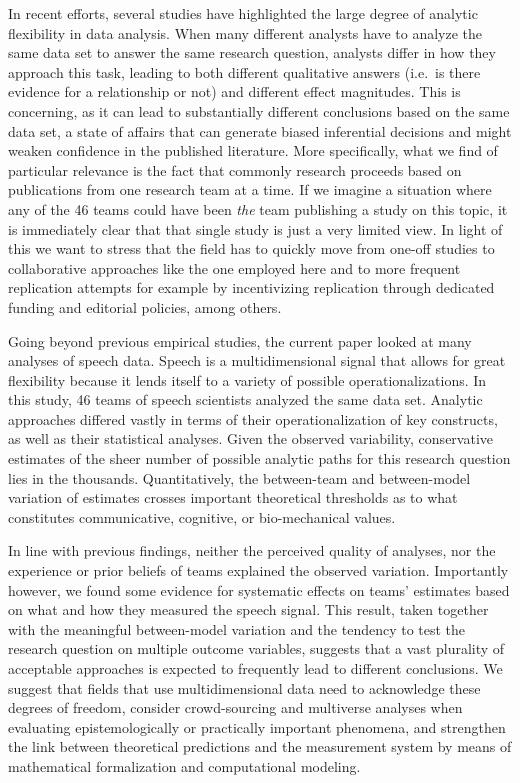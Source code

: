 \documentclass[Review,times,sageh]{sagej}
\begin{document}
In recent efforts, several studies have highlighted the large degree of analytic flexibility in data analysis.
When many different analysts have to analyze the same data set to answer the same research question, analysts differ in how they approach this task, leading to both different qualitative answers (i.e.~is there evidence for a relationship or not) and different effect magnitudes.
This is concerning, as it can lead to substantially different conclusions based on the same data set, a state of affairs that can generate biased inferential decisions and might weaken confidence in the published literature.
More specifically, what we find of particular relevance is the fact that commonly research proceeds based on publications from one research team at a time.
If we imagine a situation where any of the 46 teams could have been \emph{the} team publishing a study on this topic, it is immediately clear that that single study is just a very limited view.
In light of this we want to stress that the field has to quickly move from one-off studies to collaborative approaches like the one employed here and to more frequent replication attempts for example by incentivizing replication through dedicated funding and editorial policies, among others.

Going beyond previous empirical studies, the current paper looked at many analyses of speech data.
Speech is a multidimensional signal that allows for great flexibility because it lends itself to a variety of possible operationalizations.
In this study, 46 teams of speech scientists analyzed the same data set.
Analytic approaches differed vastly in terms of their operationalization of key constructs, as well as their statistical analyses.
Given the observed variability, conservative estimates of the sheer number of possible analytic paths for this research question lies in the thousands.
Quantitatively, the between-team and between-model variation of estimates crosses important theoretical thresholds as to what constitutes communicative, cognitive, or bio-mechanical values.

In line with previous findings, neither the perceived quality of analyses, nor the experience or prior beliefs of teams explained the observed variation.
Importantly however, we found some evidence for systematic effects on teams' estimates based on what and how they measured the speech signal.
This result, taken together with the meaningful between-model variation and the tendency to test the research question on multiple outcome variables, suggests that a vast plurality of acceptable approaches is expected to frequently lead to different conclusions.
We suggest that fields that use multidimensional data need to acknowledge these degrees of freedom, consider crowd-sourcing and multiverse analyses when evaluating epistemologically or practically important phenomena, and strengthen the link between theoretical predictions and the measurement system by means of mathematical formalization and computational modeling.
\end{document}
